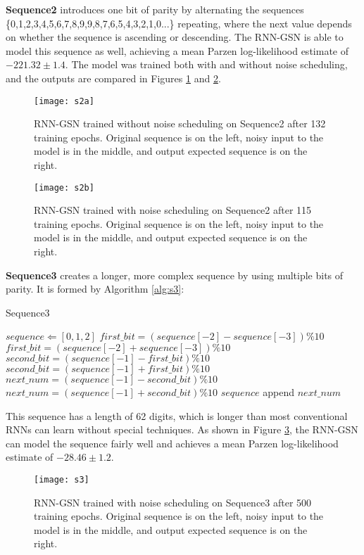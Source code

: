 \textbf{Sequence2} introduces one bit of parity by alternating the sequences \{0,1,2,3,4,5,6,7,8,9,9,8,7,6,5,4,3,2,1,0...\} repeating, where the next value depends on whether the sequence is ascending or descending. The RNN-GSN is able to model this sequence as well, achieving a mean Parzen log-likelihood estimate of $-221.32 \pm 1.4$. The model was trained both with and without noise scheduling, and the outputs are compared in Figures \ref{fig:s2a} and \ref{fig:s2b}.
\begin{figure}[h!]
  \centering
    \texttt{[image: s2a]}
\caption{RNN-GSN trained without noise scheduling on Sequence2 after 132 training epochs. Original sequence is on the left, noisy input to the model is in the middle, and output expected sequence is on the right.}\label{fig:s2a}
\end{figure}
\begin{figure}[h!]
  \centering
    \texttt{[image: s2b]}
\caption{RNN-GSN trained with noise scheduling on Sequence2 after 115 training epochs. Original sequence is on the left, noisy input to the model is in the middle, and output expected sequence is on the right.}\label{fig:s2b}
\end{figure}


\textbf{Sequence3} creates a longer, more complex sequence by using multiple bits of parity. It is formed by Algorithm \ref{alg:s3}:
\begin{algorithm}
\caption{Sequence3}\label{alg:s3}
\begin{algorithmic}
	\STATE $sequence \Leftarrow [0,1,2]$
			\STATE $first\_bit = (sequence[-2] - sequence[-3])\%10$
		\ELSE
			\STATE $first\_bit = (sequence[-2] + sequence[-3])\%10$
		\ENDIF
			\STATE $second\_bit = (sequence[-1] - first\_bit)\%10$
		\ELSE
			\STATE $second\_bit = (sequence[-1] + first\_bit)\%10$
		\ENDIF
			\STATE $next\_num = (sequence[-1] - second\_bit)\%10$
		\ELSE
			\STATE $next\_num = (sequence[-1] + second\_bit)\%10$
		\ENDIF
		\STATE $sequence$ append $next\_num$
	\ENDWHILE
\end{algorithmic}
\end{algorithm}
This sequence has a length of 62 digits, which is longer than most conventional RNNs can learn without special techniques. As shown in Figure \ref{fig:s3}, the RNN-GSN can model the sequence fairly well and achieves a mean Parzen log-likelihood estimate of $-28.46 \pm 1.2$.
\begin{figure}[h!]
  \centering
    \texttt{[image: s3]}
\caption{RNN-GSN trained with noise scheduling on Sequence3 after 500 training epochs. Original sequence is on the left, noisy input to the model is in the middle, and output expected sequence is on the right.}\label{fig:s3}
\end{figure}

